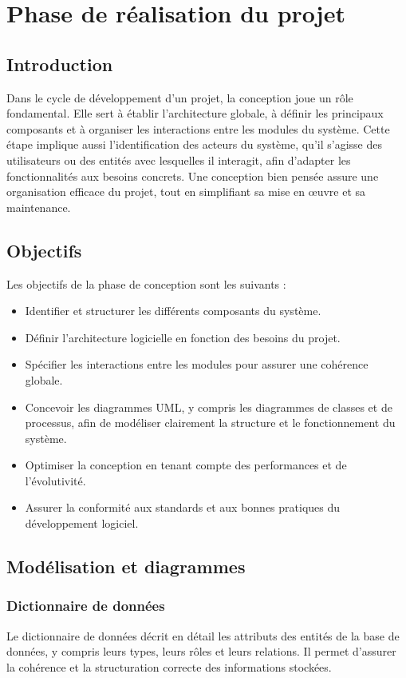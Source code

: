 \chapter{Phase de réalisation du projet}
\clearpage

\section{Introduction}
Dans le cycle de développement d’un projet, la conception joue un rôle fondamental. Elle sert à établir l’architecture globale, à définir les principaux composants et à organiser les interactions entre les modules du système. Cette étape implique aussi l’identification des acteurs du système, qu’il s’agisse des utilisateurs ou des entités avec lesquelles il interagit, afin d’adapter les fonctionnalités aux besoins concrets. Une conception bien pensée assure une organisation efficace du projet, tout en simplifiant sa mise en œuvre et sa maintenance.

\section{Objectifs}
Les objectifs de la phase de conception sont les suivants :
\begin{itemize}
    \item Identifier et structurer les différents composants du système.
    \item Définir l'architecture logicielle en fonction des besoins du projet.
    \item Spécifier les interactions entre les modules pour assurer une cohérence
          globale.
    \item Concevoir les diagrammes UML, y compris les diagrammes de classes et de
          processus, afin de modéliser clairement la structure et le fonctionnement du
          système.
    \item Optimiser la conception en tenant compte des performances et de l'évolutivité.
    \item Assurer la conformité aux standards et aux bonnes pratiques du développement
          logiciel.
\end{itemize}

\section{Modélisation et diagrammes}

\subsection{Dictionnaire de données}
Le dictionnaire de données décrit en détail les attributs des entités de la
base de données, y compris leurs types, leurs rôles et leurs relations. Il
permet d'assurer la cohérence et la structuration correcte des informations
stockées.

